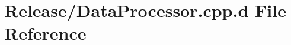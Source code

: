 \hypertarget{_release_2_data_processor_8cpp_8d}{\section{\-Release/\-Data\-Processor.cpp.\-d \-File \-Reference}
\label{_release_2_data_processor_8cpp_8d}
}
